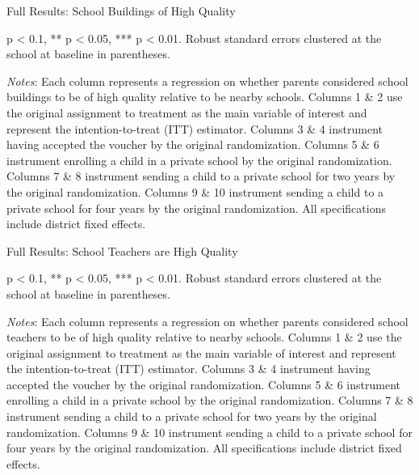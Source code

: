 \documentclass[hidelinks, 12pt, titlepage]{article}
\begin{document}
		\begin{landscape}
			\begin{table}
				\begin{threeparttable}
					\centering
					\caption{Full Results: School Buildings of High Quality\label{table:appendixschoolbuildingqual}}
					
					\begin{tablenotes}
						\item * p < 0.1, ** p < 0.05, *** p < 0.01. Robust standard errors clustered at the school at baseline in parentheses.
						\item \emph{Notes}: Each column represents a regression on whether parents considered school buildings to be of high quality relative to be nearby schools.   Columns 1 \& 2 use the original assignment to treatment as the main variable of interest and represent the intention-to-treat (ITT) estimator.  Columns 3 \& 4 instrument having accepted the voucher by the original randomization.  Columns 5 \& 6 instrument enrolling a child in a private school by the original randomization.  Columns 7 \& 8 instrument sending a child to a private school for two years by the original randomization.  Columns 9 \& 10 instrument sending a child to a private school for four years by the original randomization.  All specifications include district fixed effects.
					\end{tablenotes}
				\end{threeparttable}
			\end{table}
		\end{landscape}
	\clearpage

	\begin{landscape}
		\begin{table}
			\begin{threeparttable}
				\centering
				\caption{Full Results: School Teachers are High Quality\label{table:appendixschoolteacherqual}}
				
				\begin{tablenotes}
					\item * p < 0.1, ** p < 0.05, *** p < 0.01. Robust standard errors clustered at the school at baseline in parentheses.
					\item \emph{Notes}: Each column represents a regression on whether parents considered school teachers to be of high quality relative to nearby schools.   Columns 1 \& 2 use the original assignment to treatment as the main variable of interest and represent the intention-to-treat (ITT) estimator.  Columns 3 \& 4 instrument having accepted the voucher by the original randomization.  Columns 5 \& 6 instrument enrolling a child in a private school by the original randomization.  Columns 7 \& 8 instrument sending a child to a private school for two years by the original randomization.  Columns 9 \& 10 instrument sending a child to a private school for four years by the original randomization.  All specifications include district fixed effects.
				\end{tablenotes}
			\end{threeparttable}
		\end{table}
	\end{landscape}
	\clearpage
\end{document}
